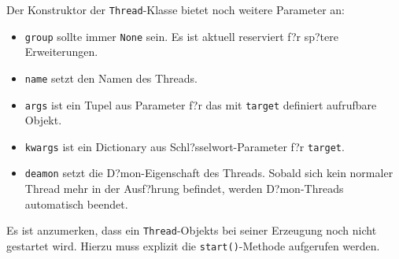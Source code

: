 Der Konstruktor  der \lstinline!Thread!-Klasse bietet noch weitere Parameter an:
\begin{itemize}
    \item \lstinline!group! sollte immer \lstinline!None! sein. Es ist aktuell reserviert f?r sp?tere Erweiterungen.
    \item \lstinline!name! setzt den Namen des Threads.
    \item \lstinline!args! ist ein Tupel aus Parameter f?r das mit \lstinline!target! definiert aufrufbare Objekt.
    \item \lstinline!kwargs! ist ein Dictionary aus Schl?sselwort-Parameter f?r \lstinline!target!.
    \item \lstinline!deamon! setzt die D?mon-Eigenschaft des Threads. Sobald sich kein normaler Thread mehr in der Ausf?hrung befindet, werden D?mon-Threads automatisch beendet.
\end{itemize}



Es ist anzumerken, dass ein \lstinline!Thread!-Objekts bei seiner Erzeugung noch nicht gestartet wird. Hierzu muss explizit die \lstinline!start()!-Methode aufgerufen werden.